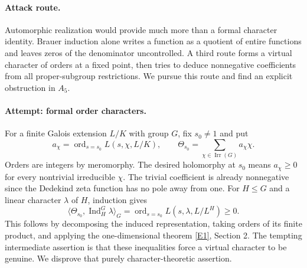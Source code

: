 \documentclass[11pt,a4paper]{article}
\newcommand{\eref}[2]{\hyperlink{extra:#1:#2}{[E#2]}}
\numberwithin{equation}{section}
\begin{document}
\paragraph{Attack route.}
Automorphic realization would provide much more than a formal character identity. Brauer induction alone writes a function as a quotient of entire functions and leaves zeros of the denominator uncontrolled. A third route forms a virtual character of orders at a fixed point, then tries to deduce nonnegative coefficients from all proper-subgroup restrictions. We pursue this route and find an explicit obstruction in $A_5$.

\paragraph{Attempt: formal order characters.}
For a finite Galois extension $L/K$ with group $G$, fix $s_0\ne1$ and put
\[
 a_\chi=\operatorname{ord}_{s=s_0}L(s,\chi,L/K),\qquad
 \Theta_{s_0}=\sum_{\chi\in\operatorname{Irr}(G)}a_\chi\chi.
\]
Orders are integers by meromorphy. The desired holomorphy at $s_0$ means $a_\chi\ge0$ for every nontrivial irreducible $\chi$. The trivial coefficient is already nonnegative since the Dedekind zeta function has no pole away from one. For $H\le G$ and a linear character $\lambda$ of $H$, induction gives
\begin{equation}\label{r66:tests}
 \langle\Theta_{s_0},\operatorname{Ind}_H^G\lambda\rangle_G
 =\operatorname{ord}_{s=s_0}L(s,\lambda,L/L^H)\ge0.
\end{equation}
This follows by decomposing the induced representation, taking orders of its finite product, and applying the one-dimensional theorem \eref{66}{1}, Section 2. The tempting intermediate assertion is that these inequalities force a virtual character to be genuine. We disprove that purely character-theoretic assertion.
\end{document}
